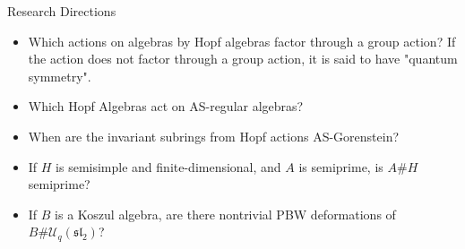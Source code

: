 \documentclass{beamer}
\begin{document}
\begin{frame}{Research Directions}
    \begin{itemize}
    \setlength{\itemsep}{2ex}
        \item<1-> Which actions on algebras by Hopf algebras factor through a group action?
                    If the action does not factor through a group action, it is said to have "quantum symmetry".
        \item<2-> Which Hopf Algebras act on AS-regular algebras?
        \item<3-> When are the invariant subrings from Hopf actions AS-Gorenstein?
        \item<4-> If $H$ is semisimple and finite-dimensional, and $A$ is semiprime, is $A\#H$ semiprime?
        \item<5-> If $B$ is a Koszul algebra, are there nontrivial PBW deformations of $B\# \mathcal{U}_q(\mathfrak{sl_2})$?
    \end{itemize}
\end{frame}
\end{document}
